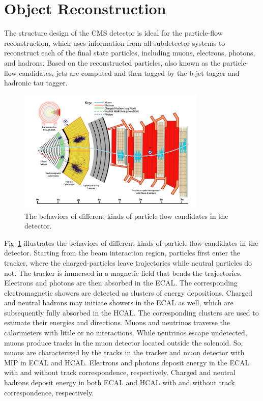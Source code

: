 
\section{Object Reconstruction}
\label{sec:cmsexperiment:reconstruction}

The structure design of the CMS detector is ideal for the particle-flow reconstruction, which uses information from all subdetector systems to reconstruct each of the final state particles, including muons, electrons, photons, and hadrons. Based on the reconstructed particles, also known as the particle-flow candidates, jets are computed and then tagged by the b-jet tagger and hadronic tau tagger.

\begin{figure}[ht]
    \centering
    \includegraphics[width=0.8\textwidth]{chapters/CMSExperiment/sectionReconstruction/figures/pfa.png}
    \caption{The behaviors of different kinds of particle-flow candidates in the detector.}
    \label{fig:cmsexperiment:reconstruction:pfa}
\end{figure}

Fig~\ref{fig:cmsexperiment:reconstruction:pfa} illustrates the behaviors of different kinds of particle-flow candidates in the detector. Starting from the beam interaction region, particles first enter the tracker, where the charged-particles leave trajectories while neutral particles do not. The tracker is immersed in a magnetic field that bends the trajectories. Electrons and photons are then absorbed in the ECAL. The corresponding electromagnetic showers are detected as clusters of energy depositions. Charged and neutral hadrons may initiate showers in the ECAL as well, which are subsequently fully absorbed in the HCAL. The corresponding clusters are used to estimate their energies and directions. Muons and neutrinos traverse the calorimeters with little or no interactions. While neutrinos escape undetected, muons produce tracks in the muon detector located outside the solenoid. So, muons are characterized by the tracks in the tracker and muon detector with MIP in ECAL and HCAL. Electrons and photons deposit energy in the ECAL with and without track correspondence, respectively. Charged and neutral hadrons deposit energy in both ECAL and HCAL with and without track correspondence, respectively. 


